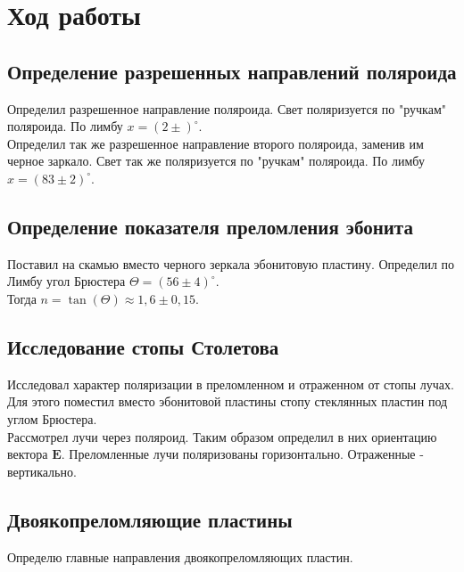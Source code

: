 

\section{Ход работы}

\subsection{Определение разрешенных направлений поляроида}

Определил разрешенное направление поляроида. Свет поляризуется по "ручкам" поляроида.
По лимбу $ x = (2\pm) ^\circ$. \\

Определил так же разрешенное направление второго поляроида, заменив им черное заркало.
Свет так же поляризуется по "ручкам" поляроида. По лимбу $ x = (83\pm2) ^\circ $.

\subsection{Определение показателя преломления эбонита}

Поставил на скамью вместо черного зеркала эбонитовую пластину. Определил по Лимбу угол
Брюстера $ \Theta = (56\pm4) ^\circ $. \\

Тогда $ n = \tan(\Theta) \approx 1,6\pm0,15 $.

\subsection{Исследование стопы Столетова}

Исследовал характер поляризации в преломленном и отраженном от стопы лучах. Для этого
поместил вместо эбонитовой пластины стопу стеклянных пластин под углом Брюстера. \\

Рассмотрел лучи через поляроид. Таким образом определил в них ориентацию вектора
$ \textbf{E} $. Преломленные лучи поляризованы горизонтально. Отраженные - вертикально.

\subsection{Двоякопреломляющие пластины}

Определю главные направления двоякопреломляющих пластин. \\

